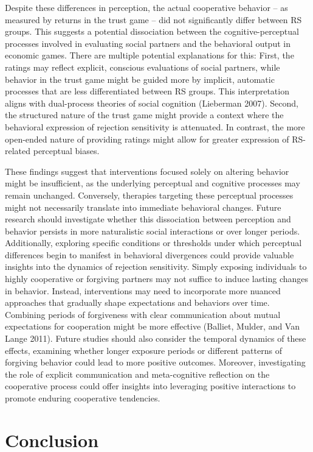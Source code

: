 \documentclass[
]{article}
\begin{document}
Despite these differences in perception, the actual cooperative behavior -- as measured by returns in the trust game -- did not significantly differ between RS groups. This suggests a potential dissociation between the cognitive-perceptual processes involved in evaluating social partners and the behavioral output in economic games. There are multiple potential explanations for this: First, the ratings may reflect explicit, conscious evaluations of social partners, while behavior in the trust game might be guided more by implicit, automatic processes that are less differentiated between RS groups. This interpretation aligns with dual-process theories of social cognition (Lieberman 2007). Second, the structured nature of the trust game might provide a context where the behavioral expression of rejection sensitivity is attenuated. In contrast, the more open-ended nature of providing ratings might allow for greater expression of RS-related perceptual biases.

These findings suggest that interventions focused solely on altering behavior might be insufficient, as the underlying perceptual and cognitive processes may remain unchanged. Conversely, therapies targeting these perceptual processes might not necessarily translate into immediate behavioral changes. Future research should investigate whether this dissociation between perception and behavior persists in more naturalistic social interactions or over longer periods. Additionally, exploring specific conditions or thresholds under which perceptual differences begin to manifest in behavioral divergences could provide valuable insights into the dynamics of rejection sensitivity. Simply exposing individuals to highly cooperative or forgiving partners may not suffice to induce lasting changes in behavior. Instead, interventions may need to incorporate more nuanced approaches that gradually shape expectations and behaviors over time. Combining periods of forgiveness with clear communication about mutual expectations for cooperation might be more effective (Balliet, Mulder, and Van Lange 2011). Future studies should also consider the temporal dynamics of these effects, examining whether longer exposure periods or different patterns of forgiving behavior could lead to more positive outcomes. Moreover, investigating the role of explicit communication and meta-cognitive reflection on the cooperative process could offer insights into leveraging positive interactions to promote enduring cooperative tendencies.

\section{Conclusion}\label{conclusion}
\end{document}
